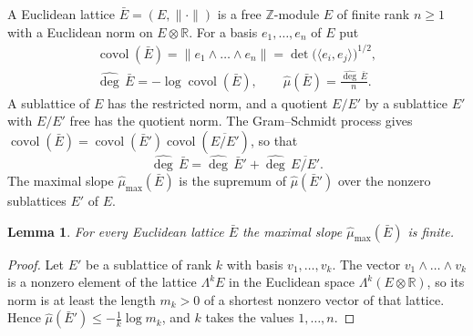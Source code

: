 \documentclass[11pt,letterpaper]{article}
\newtheorem{lemma}[theorem]{Lemma}
\numberwithin{equation}{section}
\begin{document}
A Euclidean lattice $\bar E=(E,\|\cdot\|)$ is a free $\mathbb Z$-module $E$ of finite rank $n\ge1$ with a Euclidean norm on $E\otimes\mathbb R$. For a basis $e_1,\dots,e_n$ of $E$ put
\begin{gather*}
\operatorname{covol}(\bar E)=\|e_1\wedge\dots\wedge e_n\|=\det\big(\langle e_i,e_j\rangle\big)^{1/2},\\
\widehat{\deg}\,\bar E=-\log\operatorname{covol}(\bar E),\qquad\hat\mu(\bar E)=\frac{\widehat{\deg}\,\bar E}{n}.
\end{gather*}
A sublattice of $E$ has the restricted norm, and a quotient $E/E'$ by a sublattice $E'$ with $E/E'$ free has the quotient norm. The Gram--Schmidt process gives $\operatorname{covol}(\bar E)=\operatorname{covol}(\bar E')\operatorname{covol}(\overline{E/E'})$, so that
\begin{equation}\label{add}
\widehat{\deg}\,\bar E=\widehat{\deg}\,\bar E'+\widehat{\deg}\,\overline{E/E'} .
\end{equation}
The maximal slope $\hat\mu_{\max}(\bar E)$ is the supremum of $\hat\mu(\bar E')$ over the nonzero sublattices $E'$ of $E$.

\begin{lemma}\label{mumax}
For every Euclidean lattice $\bar E$ the maximal slope $\hat\mu_{\max}(\bar E)$ is finite.
\end{lemma}
\begin{proof}
Let $E'$ be a sublattice of rank $k$ with basis $v_1,\dots,v_k$. The vector $v_1\wedge\dots\wedge v_k$ is a nonzero element of the lattice $\Lambda^kE$ in the Euclidean space $\Lambda^k(E\otimes\mathbb R)$, so its norm is at least the length $m_k>0$ of a shortest nonzero vector of that lattice. Hence $\hat\mu(\bar E')\le-\frac1k\log m_k$, and $k$ takes the values $1,\dots,n$.
\end{proof}
\end{document}
